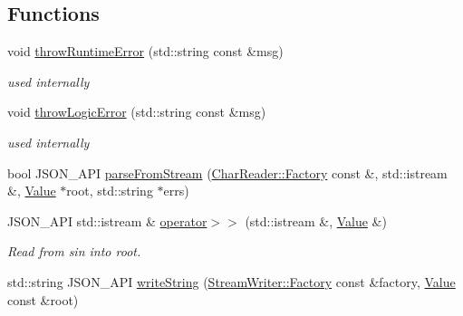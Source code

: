 \subsection*{Functions}
\begin{DoxyCompactItemize}
\item 
\hypertarget{namespace_json_a97f039a107b3f6cf1c3edee50e978f76}{}void \hyperlink{namespace_json_a97f039a107b3f6cf1c3edee50e978f76}{throw\+Runtime\+Error} (std\+::string const \&msg)\label{namespace_json_a97f039a107b3f6cf1c3edee50e978f76}

\begin{DoxyCompactList}\small\item\em used internally \end{DoxyCompactList}\item 
\hypertarget{namespace_json_a27613326e9e36bbfe04a905ac90caa91}{}void \hyperlink{namespace_json_a27613326e9e36bbfe04a905ac90caa91}{throw\+Logic\+Error} (std\+::string const \&msg)\label{namespace_json_a27613326e9e36bbfe04a905ac90caa91}

\begin{DoxyCompactList}\small\item\em used internally \end{DoxyCompactList}\item 
bool J\+S\+O\+N\+\_\+\+A\+P\+I \hyperlink{namespace_json_acfebeaf759a841173ddce34c4da22486}{parse\+From\+Stream} (\hyperlink{class_json_1_1_char_reader_1_1_factory}{Char\+Reader\+::\+Factory} const \&, std\+::istream \&, \hyperlink{class_json_1_1_value}{Value} $\ast$root, std\+::string $\ast$errs)
\item 
J\+S\+O\+N\+\_\+\+A\+P\+I std\+::istream \& \hyperlink{namespace_json_a4d245ef719cc0853e8e78eb5f99c16e5}{operator$>$$>$} (std\+::istream \&, \hyperlink{class_json_1_1_value}{Value} \&)
\begin{DoxyCompactList}\small\item\em Read from \textquotesingle{}sin\textquotesingle{} into \textquotesingle{}root\textquotesingle{}. \end{DoxyCompactList}\item 
\hypertarget{namespace_json_afd767fe4c7e962d0ff3d1a6d1622619f}{}std\+::string J\+S\+O\+N\+\_\+\+A\+P\+I \hyperlink{namespace_json_afd767fe4c7e962d0ff3d1a6d1622619f}{write\+String} (\hyperlink{class_json_1_1_stream_writer_1_1_factory}{Stream\+Writer\+::\+Factory} const \&factory, \hyperlink{class_json_1_1_value}{Value} const \&root)\label{namespace_json_afd767fe4c7e962d0ff3d1a6d1622619f}


\end{DoxyCompactItemize}
